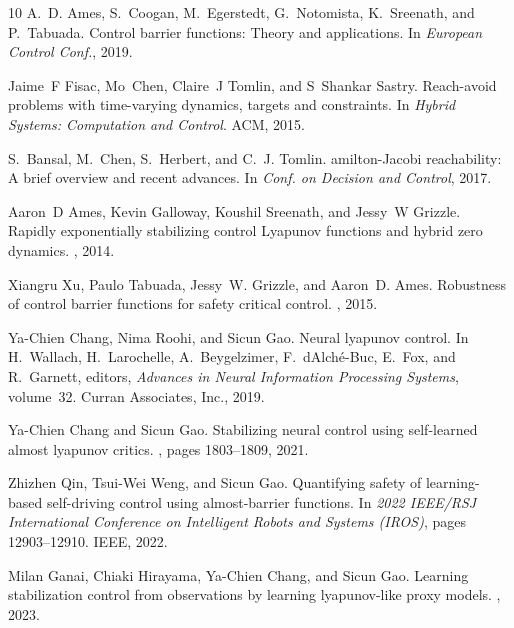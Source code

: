 \documentclass{article}
\theoremstyle{definition}
\begin{document}
\begin{thebibliography}{10}
A.~D. {Ames}, S.~{Coogan}, M.~{Egerstedt}, G.~{Notomista}, K.~{Sreenath}, and P.~{Tabuada}.
\newblock Control barrier functions: Theory and applications.
\newblock In {\em European Control Conf.}, 2019.

Jaime~F Fisac, Mo~Chen, Claire~J Tomlin, and S~Shankar Sastry.
\newblock Reach-avoid problems with time-varying dynamics, targets and constraints.
\newblock In {\em Hybrid Systems: Computation and Control}. ACM, 2015.

S.~{Bansal}, M.~{Chen}, S.~{Herbert}, and C.~J. {Tomlin}.
amilton-{J}acobi reachability: A brief overview and recent advances.
\newblock In {\em Conf. on Decision and Control}, 2017.

Aaron~D Ames, Kevin Galloway, Koushil Sreenath, and Jessy~W Grizzle.
\newblock Rapidly exponentially stabilizing control {L}yapunov functions and hybrid zero dynamics.
, 2014.

Xiangru Xu, Paulo Tabuada, Jessy~W. Grizzle, and Aaron~D. Ames.
\newblock Robustness of control barrier functions for safety critical control.
, 2015.

Ya-Chien Chang, Nima Roohi, and Sicun Gao.
\newblock Neural lyapunov control.
\newblock In H.~Wallach, H.~Larochelle, A.~Beygelzimer, F.~d\textquotesingle Alch\'{e}-Buc, E.~Fox, and R.~Garnett, editors, {\em Advances in Neural Information Processing Systems}, volume~32. Curran Associates, Inc., 2019.

Ya-Chien Chang and Sicun Gao.
\newblock Stabilizing neural control using self-learned almost lyapunov critics.
, pages 1803--1809, 2021.

Zhizhen Qin, Tsui-Wei Weng, and Sicun Gao.
\newblock Quantifying safety of learning-based self-driving control using almost-barrier functions.
\newblock In {\em 2022 IEEE/RSJ International Conference on Intelligent Robots and Systems (IROS)}, pages 12903--12910. IEEE, 2022.

Milan Ganai, Chiaki Hirayama, Ya-Chien Chang, and Sicun Gao.
\newblock Learning stabilization control from observations by learning lyapunov-like proxy models.
, 2023.


\end{thebibliography}
\end{document}
